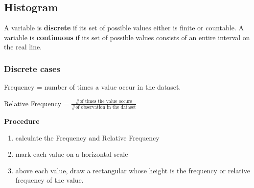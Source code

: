 \subsection{Histogram}
\begin{defn}
A variable is \textbf{discrete} if its set of possible values either is finite or countable.
A variable is \textbf{continuous} if its set of possible values consists of an entire interval on the real line.
\end{defn}

\subsubsection{Discrete cases}

Frequency = number of times a value occur in the dataset.

Relative Frequency = $\frac{\text{\# of times the value occurs}}{\text{\# of observation in the dataset}}$
\vspace{4mm}

\textbf{Procedure}
\begin{enumerate}
  \item calculate the Frequency and Relative Frequency
  \item mark each value on a horizontal scale
  \item above each value, draw a rectangular whose height is the frequency or relative frequency of the value.
\end{enumerate}

\begin{figure}[H]
\centering
{}

\end{figure}

